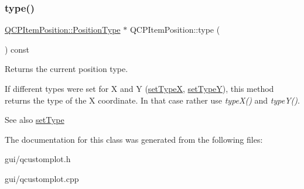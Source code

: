 \subsubsection{\texorpdfstring{type()}{type()}}
{\footnotesize\ttfamily \hyperlink{classQCPItemPosition_aad9936c22bf43e3d358552f6e86dbdc8}{Q\+C\+P\+Item\+Position\+::\+Position\+Type} $\ast$ Q\+C\+P\+Item\+Position\+::type (\begin{DoxyParamCaption}{ }\end{DoxyParamCaption}) const\hspace{0.3cm}{\ttfamily [inline]}}

Returns the current position type.

If different types were set for X and Y (\hyperlink{classQCPItemPosition_a2113b2351d6d00457fb3559a4e20c3ea}{set\+TypeX}, \hyperlink{classQCPItemPosition_ac2a454aa5a54c1615c50686601ec4510}{set\+TypeY}), this method returns the type of the X coordinate. In that case rather use {\itshape type\+X()} and {\itshape type\+Y()}.

\begin{DoxySeeAlso}{See also}
\hyperlink{classQCPItemPosition_aa476abf71ed8fa4c537457ebb1a754ad}{set\+Type} 
\end{DoxySeeAlso}


The documentation for this class was generated from the following files\+:\begin{DoxyCompactItemize}
\item 
gui/qcustomplot.\+h\item 
gui/qcustomplot.\+cpp\end{DoxyCompactItemize}
